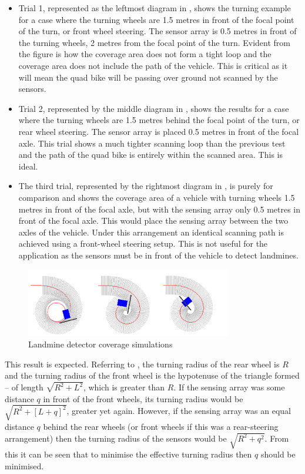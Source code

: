 \documentclass[main.tex]{subfiles}
\begin{document}
\begin{itemize}
\item Trial 1, represented as the leftmost diagram in , shows the turning example for a case where the turning wheels are 1.5 metres in front of the focal point of the turn, or front wheel steering. The sensor array is 0.5 metres in front of the turning wheels, 2 metres from the focal point of the turn. Evident from the figure is how the coverage area does not form a tight loop and the coverage area does not include the path of the vehicle. This is critical as it will mean the quad bike will be passing over ground not scanned by the sensors.
\item Trial 2, represented by the middle diagram in , shows the results for a case where the turning wheels are 1.5 metres behind the focal point of the turn, or rear wheel steering. The sensor array is placed 0.5 metres in front of the focal axle. This trial shows a much tighter scanning loop than the previous test and the path of the quad bike is entirely within the scanned area. This is ideal.
\item The third trial, represented by the rightmost diagram in , is purely for comparison and shows the coverage area of a vehicle with turning wheels 1.5 metres in front of the focal axle, but with the sensing array only 0.5 metres in front of the focal axle. This would place the sensing array between the two axles of the vehicle. Under this arrangement an identical scanning path is achieved using a front-wheel steering setup. This is not useful for the application as the sensors must be in front of the vehicle to detect landmines.
\end{itemize}
\begin{figure}[ht]
\includegraphics[width=0.8\textwidth]{4-DetailedDesign/Detector_Coverage.png}
\centering
\caption{Landmine detector coverage simulations} 
\end{figure}
This result is expected. Referring to , the turning radius of the rear wheel is $R$ and the turning radius of the front wheel is the hypotenuse of the triangle formed – of length $\sqrt{R^2 + L^2}$, which is greater than $R$. If the sensing array was some distance $q$ in front of the front wheels, its turning radius would be $\sqrt{R^2 + [L+q]^2}$, greater yet again. However, if the sensing array was an equal distance $q$ behind the rear wheels (or front wheels if this was a rear-steering arrangement) then the turning radius of the sensors would be $\sqrt{R^2 + q^2}$. From this it can be seen that to minimise the effective turning radius then $q$ should be minimised.
\end{document}
